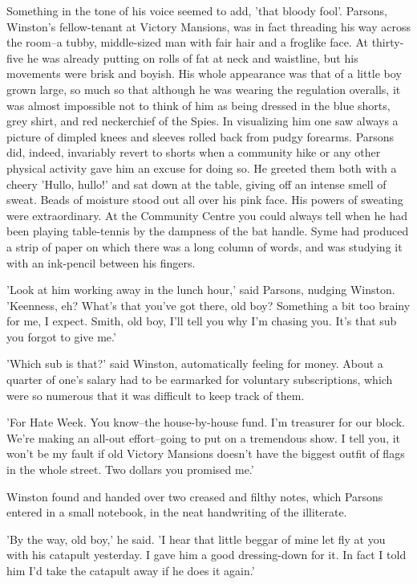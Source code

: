 \documentclass{article}
\begin{document}
Something in the tone of his voice seemed to add, 'that bloody fool'.
Parsons, Winston's fellow-tenant at Victory Mansions, was in fact threading
his way across the room--a tubby, middle-sized man with fair hair and a
froglike face. At thirty-five he was already putting on rolls of fat at
neck and waistline, but his movements were brisk and boyish. His whole
appearance was that of a little boy grown large, so much so that although
he was wearing the regulation overalls, it was almost impossible not to
think of him as being dressed in the blue shorts, grey shirt, and red
neckerchief of the Spies. In visualizing him one saw always a picture of
dimpled knees and sleeves rolled back from pudgy forearms. Parsons did,
indeed, invariably revert to shorts when a community hike or any other
physical activity gave him an excuse for doing so. He greeted them both
with a cheery 'Hullo, hullo!' and sat down at the table, giving off an
intense smell of sweat. Beads of moisture stood out all over his pink face.
His powers of sweating were extraordinary. At the Community Centre you
could always tell when he had been playing table-tennis by the dampness of
the bat handle. Syme had produced a strip of paper on which there was a
long column of words, and was studying it with an ink-pencil between his
fingers.

'Look at him working away in the lunch hour,' said Parsons, nudging
Winston. 'Keenness, eh? What's that you've got there, old boy? Something
a bit too brainy for me, I expect. Smith, old boy, I'll tell you why I'm
chasing you. It's that sub you forgot to give me.'

'Which sub is that?' said Winston, automatically feeling for money. About
a quarter of one's salary had to be earmarked for voluntary subscriptions,
which were so numerous that it was difficult to keep track of them.

'For Hate Week. You know--the house-by-house fund. I'm treasurer for our
block. We're making an all-out effort--going to put on a tremendous show.
I tell you, it won't be my fault if old Victory Mansions doesn't have the
biggest outfit of flags in the whole street. Two dollars you promised me.'

Winston found and handed over two creased and filthy notes, which Parsons
entered in a small notebook, in the neat handwriting of the illiterate.

'By the way, old boy,' he said. 'I hear that little beggar of mine let fly
at you with his catapult yesterday. I gave him a good dressing-down for it.
In fact I told him I'd take the catapult away if he does it again.'
\end{document}
